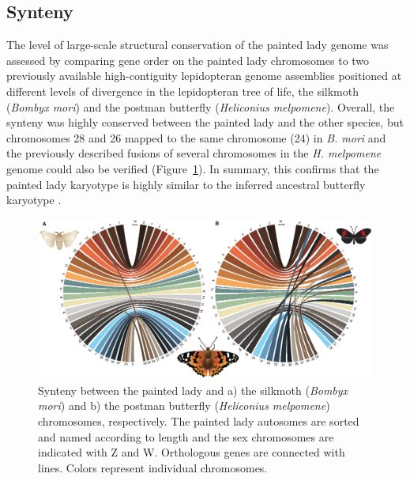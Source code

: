 \documentclass[twocolumn]{bmcart}%
\begin{document}
\subsection*{Synteny}
The level of large-scale structural conservation of the painted lady genome was assessed by comparing gene order on the painted lady chromosomes to two previously available high-contiguity lepidopteran genome assemblies positioned at different levels of divergence in the lepidopteran tree of life, the silkmoth (\textit{Bombyx mori}) and the postman butterfly (\textit{Heliconius melpomene}). Overall, the synteny was highly conserved between the painted lady and the other species, but chromosomes 28 and 26 mapped to the same chromosome (24) in \textit{B. mori} and the previously described fusions of several chromosomes in the \textit{H. melpomene} genome \citep{daveyNoEvidenceMaintenance2017} could also be verified (Figure~\ref{fig:2}). In summary, this confirms that the painted lady karyotype is highly similar to the inferred ancestral butterfly karyotype \citep{aholaGlanvilleFritillaryGenome2014}.

\begin{figure}
    \centering
    \includegraphics[width=1.99\linewidth]{ShipilinaNasvall_All_FIG2_complressed.eps}
    \caption{Synteny between the painted lady and a) the silkmoth (\textit{Bombyx mori}) and b) the postman butterfly (\textit{Heliconius melpomene}) chromosomes, respectively. The painted lady autosomes are sorted and named according to length and the sex chromosomes are indicated with Z and W. Orthologous genes are connected with lines. Colors represent individual chromosomes.}
    \label{fig:2}
\end{figure}
\end{document}
